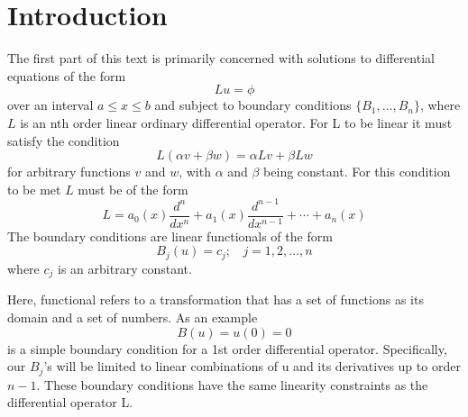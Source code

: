 \section{Introduction}
The first part of this text is primarily concerned with solutions to differential equations of the form
\begin{equation}
    Lu=\phi
\end{equation}
over an interval \(a \leq x \leq b\) and subject to boundary conditions \( \{ B_1, \dots ,B_n \} \), where \(L\) is an nth order linear ordinary differential operator.  For L to be linear it must satisfy the condition
\begin{equation}
	L(\alpha v + \beta w) = \alpha Lv + \beta Lw
\end{equation}
for arbitrary functions \(v\) and \(w\), with \(\alpha\) and \(\beta\) being constant. For this condition to be met \(L\) must be of the form
\begin{equation} 
	L = a_0(x) \frac{d^n}{dx^n} + a_1(x) \frac{d^{n-1}}{dx^{n-1}} + \cdots + a_n(x)
\end{equation}
The boundary conditions are linear functionals of the form 
\begin{equation}
	B_j (u) = c_j;~~~~ j=1,2,\dots,n
\end{equation}
where \(c_j\) is an arbitrary constant. 

Here, functional refers to a transformation that has a set of functions as its domain and a set of numbers. As an example
\begin{equation}
	B (u) = u(0) = 0
\end{equation}
is a simple boundary condition for a 1st order differential operator. Specifically, our \(B_j\)'s will be limited to linear combinations of u and its derivatives up to order \(n-1\). These boundary conditions have the same linearity constraints as the differential operator L. 

